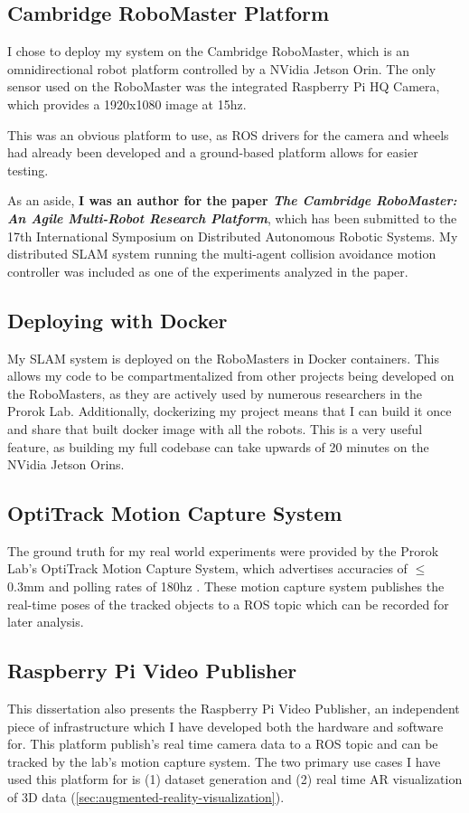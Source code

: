 \subsection{Cambridge RoboMaster Platform}
\label{sec:cambridge-robomaster-platform}
I chose to deploy my system on the Cambridge RoboMaster, which is an omnidirectional robot platform controlled by a NVidia Jetson Orin. The only sensor used on the RoboMaster was the integrated Raspberry Pi HQ Camera, which provides a 1920x1080 image at 15hz.

This was an obvious platform to use, as ROS drivers for the camera and wheels had already been developed and a ground-based platform allows for easier testing.

As an aside, \textbf{I was an author for the paper \textit{The Cambridge RoboMaster: An Agile Multi-Robot Research Platform}}, which has been submitted to the 17th International Symposium on Distributed Autonomous Robotic Systems. My distributed SLAM system running the multi-agent collision avoidance motion controller was included as one of the experiments analyzed in the paper.

\subsection{Deploying with Docker}
\label{sec:deploying-with-docker}
My SLAM system is deployed on the RoboMasters in Docker containers. This allows my code to be compartmentalized from other projects being developed on the RoboMasters, as they are actively used by numerous researchers in the Prorok Lab. Additionally, dockerizing my project means that I can build it once and share that built docker image with all the robots. This is a very useful feature, as building my full codebase can take upwards of 20 minutes on the NVidia Jetson Orins.

\subsection{OptiTrack Motion Capture System}
\label{sec:optitrack-motion-capture-system}
The ground truth for my real world experiments were provided by the Prorok Lab's OptiTrack Motion Capture System, which advertises accuracies of $\leq$0.3mm and polling rates of 180hz \autocite{OptiTrackForRobotics}. These motion capture system publishes the real-time poses of the tracked objects to a ROS topic which can be recorded for later analysis.

\subsection{Raspberry Pi Video Publisher}
\label{sec:raspberry-pi-video-publisher}
This dissertation also presents the Raspberry Pi Video Publisher, an independent piece of infrastructure which I have developed both the hardware and software for. This platform publish's real time camera data to a ROS topic and can be tracked by the lab's motion capture system. The two primary use cases I have used this platform for is (1) dataset generation and (2) real time AR visualization of 3D data (\autoref{sec:augmented-reality-visualization}).

